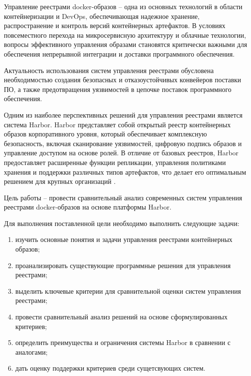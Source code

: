 
Управление реестрами docker-образов – одна из основных технологий в области контейнеризации и DevOps, обеспечивающая надежное хранение, распространение и контроль версий контейнерных артефактов. В условиях повсеместного перехода на микросервисную архитектуру и облачные технологии, вопросы эффективного управления образами становятся критически важными для обеспечения непрерывной интеграции и доставки программного обеспечения.

Актуальность использования систем управления реестрами обусловена необходимостью создания безопасных и отказоустойчивых конвейеров поставки ПО, а также предотвращения уязвимостей в цепочке поставок программного обеспечения.

Одним из наиболее перспективных решений для управления реестрами является система Harbor. Harbor представляет собой открытый реестр контейнерных образов корпоративного уровня, который обеспечивает комплексную безопасность, включая сканирование уязвимостей, цифровую подпись образов и управление доступом на основе ролей. В отличие от базовых реестров, Harbor предоставляет расширенные функции репликации, управления политиками хранения и поддержки различных типов артефактов, что делает его оптимальным решением для крупных организаций \cite{harbor-docs}.

Цель работы -- провести сравнительный анализ современных систем управления реестрами docker-образов на основе платформы Harbor.

Для выполнения поставленной цели необходимо выполнить следующие задачи:
\begin{enumerate}
	\item изучить основные понятия и задачи управления реестрами контейнерных образов;
	\item проанализировать существующие программные решения для управления реестрами;
	\item выделить ключевые критерии для сравнительной оценки систем управления реестрами;
	\item провести сравнительный анализ решений на основе сформулированных критериев;
	\item определить преимущества и ограничения системы Harbor в сравнении с аналогами;
	\item дать оценку поддержки критериев среди сущетсвующих систем.
\end{enumerate}

\clearpage
